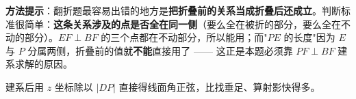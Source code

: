 \begin{answer}
\begin{gktip}
\textbf{方法提示}：翻折题最容易出错的地方是\textbf{把折叠前的关系当成折叠后还成立}。判断标准很简单：\textbf{这条关系涉及的点是否全在同一侧}（要么全在被折的部分，要么全在不动的部分）。$EF\perp BF$ 的三个点都在不动部分，所以能用；而"$PE$ 的长度"因为 $E$ 与 $P$ 分属两侧，折叠前的值就\textbf{不能}直接用了 —— 这正是本题必须靠 $PF\perp BF$ 建系求解的原因。

建系后用 $z$ 坐标除以 $|DP|$ 直接得线面角正弦，比找垂足、算射影快得多。
\end{gktip}



\par\medskip

\end{answer}
